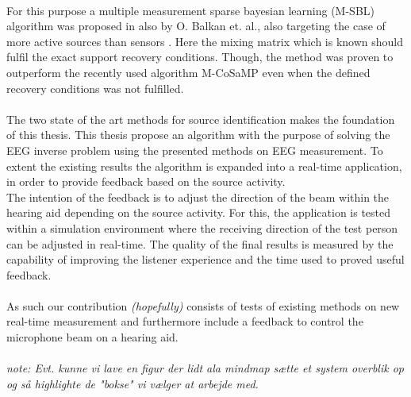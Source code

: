 \\
For this purpose a multiple measurement sparse bayesian learning (M-SBL) algorithm was proposed in \cite{Balkan2014} also by O. Balkan et. al., also targeting the case of more active sources than sensors \cite{Balkan2014}. Here the mixing matrix which is known should fulfil the exact support recovery conditions. Though, the method was proven to outperform the recently used algorithm M-CoSaMP even when the defined recovery conditions was not fulfilled.  
\\   
\\
The two state of the art methods for source identification makes the foundation of this thesis. This thesis propose an algorithm with the purpose of solving the EEG inverse problem using the presented methods on EEG measurement. To extent the existing results the algorithm is expanded into a real-time application, in order to provide feedback based on the source activity.\\
The intention of the feedback is to adjust the direction of the beam within the hearing aid depending on the source activity.      
For this, the application is tested within a simulation environment where the receiving direction of the test person can be adjusted in real-time. 
The quality of the final results is measured by the capability of improving the listener experience and the time used to proved useful feedback. \\
\\
As such our contribution \textit{(hopefully)} consists of tests of existing methods on new real-time measurement and furthermore include a feedback to control the microphone beam on a hearing aid.  
\\ \\
\textit{note: Evt. kunne vi lave en figur der lidt ala mindmap sætte et system overblik op og så highlighte de "bokse" vi vælger at arbejde med. }

  





 
